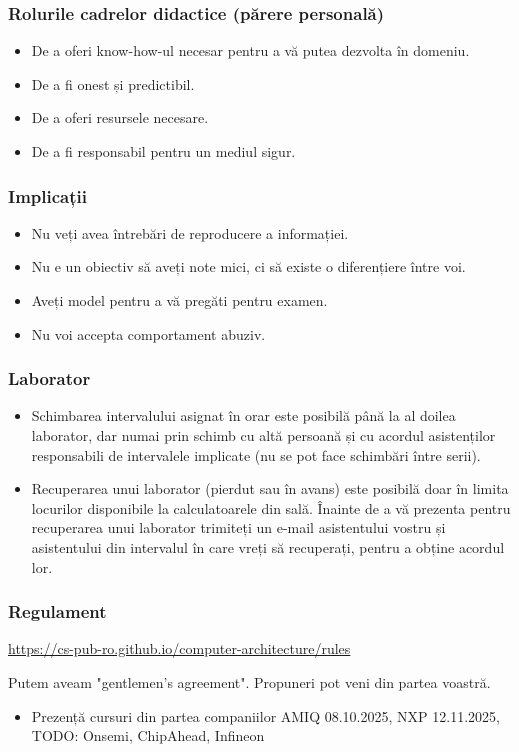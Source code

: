 \begin{frame}
    \frametitle{Rolurile cadrelor didactice (părere personală)}
\begin{itemize}
    \item De a oferi know-how-ul necesar pentru a vă putea dezvolta în domeniu.
    \item De a fi onest și predictibil.
    \item De a oferi resursele necesare.
    \item De a fi responsabil pentru un mediul sigur.
\end{itemize}

\end{frame}

\begin{frame}
    \frametitle{Implicații}
\begin{itemize}
    \item Nu veți avea întrebări de reproducere a informației.
    \item Nu e un obiectiv să aveți note mici, ci să existe o diferențiere între voi.
    \item Aveți model pentru a vă pregăti pentru examen.
    \item Nu voi accepta comportament abuziv.
\end{itemize}

\end{frame}

\begin{frame}
    \frametitle{Laborator}
    
\begin{itemize}
    \item Schimbarea intervalului asignat în orar este posibilă până la al doilea laborator, dar numai prin schimb cu altă persoană și cu acordul asistenților responsabili de intervalele implicate (nu se pot face schimbări între serii).
    \item Recuperarea unui laborator (pierdut sau în avans) este posibilă doar în limita locurilor disponibile la calculatoarele din sală. Înainte de a vă prezenta pentru recuperarea unui laborator trimiteți un e-mail asistentului vostru și asistentului din intervalul în care vreți să recuperați, pentru a obține acordul lor.
\end{itemize}
\end{frame}


\begin{frame}
    \frametitle{Regulament}
    
    \href{https://cs-pub-ro.github.io/computer-architecture/rules}{https://cs-pub-ro.github.io/computer-architecture/rules}

    Putem aveam "gentlemen's agreement". Propuneri pot veni din partea voastră.

    \begin{itemize}
        \item Prezență cursuri din partea companiilor AMIQ 08.10.2025, NXP 12.11.2025, TODO: Onsemi, ChipAhead, Infineon
    \end{itemize}

\end{frame}

